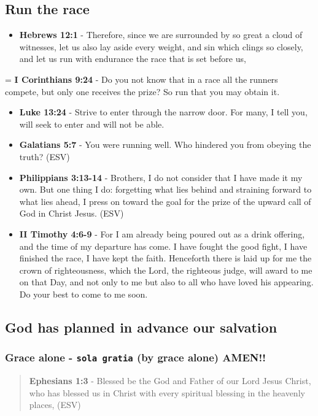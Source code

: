 \documentclass[11pt]{article}
\begin{document}
\subsection{Run the race}
\label{sec:org2e40651}
\begin{itemize}
\item \textbf{Hebrews 12:1} - Therefore, since we are surrounded by so great a cloud of witnesses, let us also lay aside every weight, and sin which clings so closely, and let us run with endurance the race that is set before us,
\end{itemize}
= \textbf{I Corinthians 9:24} - Do you not know that in a race all the runners compete, but only one receives the prize? So run that you may obtain it.
\begin{itemize}
\item \textbf{Luke 13:24} - Strive to enter through the narrow door. For many, I tell you, will seek to enter and will not be able.
\item \textbf{Galatians 5:7} - You were running well. Who hindered you from obeying the truth? (ESV)
\item \textbf{Philippians 3:13-14} - Brothers, I do not consider that I have made it my own. But one thing I do: forgetting what lies behind and straining forward to what lies ahead, I press on toward the goal for the prize of the upward call of God in Christ Jesus. (ESV)
\item \textbf{II Timothy 4:6-9} - For I am already being poured out as a drink offering, and the time of my departure has come. I have fought the good fight, I have finished the race, I have kept the faith. Henceforth there is laid up for me the crown of righteousness, which the Lord, the righteous judge, will award to me on that Day, and not only to me but also to all who have loved his appearing. Do your best to come to me soon.
\end{itemize}

\subsection{God has planned in advance our salvation}
\label{sec:orge2e7f34}
\subsubsection{Grace alone - \texttt{sola gratia} (by grace alone) AMEN!!}
\label{sec:orgf01ca36}
\begin{quote}
\textbf{Ephesians 1:3} - Blessed be the God and Father of our Lord Jesus Christ, who has blessed us in Christ with every spiritual blessing in the heavenly places, (ESV)
\end{quote}
\end{document}
